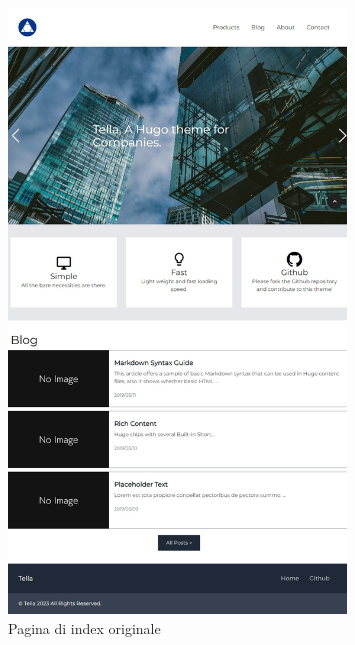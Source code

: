 \documentclass[target=bach,aauheader=]{thud}
\begin{document}
\begin{figure}
    \begin{minipage}{0.5\textwidth}
      \centering
      \includegraphics[width=0.8\textwidth]{images/index-iniziale.png}
      \caption{Pagina di index originale}
      \label{img:indexin}
    \end{minipage}
    \begin{minipage}{0.5\textwidth}
      \centering

\end{minipage}
\end{figure}
\end{document}

